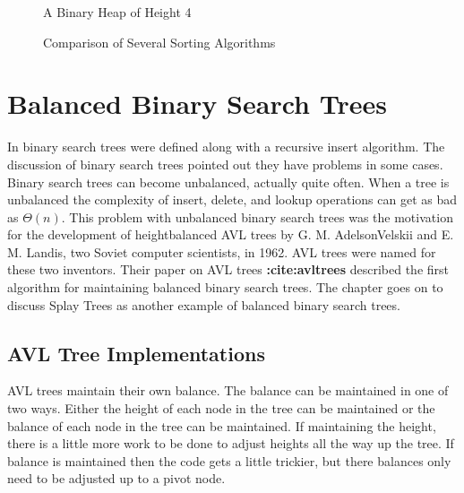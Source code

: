 \documentclass[letterpaper,10pt,english]{sphinxmanual}
\begin{document}
\begin{figure}[htbp]
\centering
\capstart

\noindent{}
\caption{A Binary Heap of Height 4}\label{\detokenize{chap8/chap8:id23}}\end{figure}

\begin{figure}[htbp]
\centering
\capstart

\noindent{}
\caption{Comparison of Several Sorting Algorithms}\label{\detokenize{chap8/chap8:id24}}\end{figure}


\chapter{Balanced Binary Search Trees}
\label{\detokenize{chap9/chap9:balanced-binary-search-trees}}\label{\detokenize{chap9/chap9:balancedtreechap}}\label{\detokenize{chap9/chap9::doc}}
In {\hyperref[\detokenize{chap6/chap6:chap6}]{}} binary search trees were defined along with a recursive insert algorithm. The discussion of binary search trees pointed out they have problems in some cases. Binary search trees can become unbalanced, actually quite often. When a tree is unbalanced the complexity of insert, delete, and lookup operations can get as bad as \(\Theta(n)\). This problem with unbalanced binary search trees was the motivation for the development of height\sphinxhyphen{}balanced AVL trees by G. M. Adelson\sphinxhyphen{}Velskii and E. M. Landis, two Soviet computer scientists, in 1962. AVL trees were named for these two inventors. Their paper on AVL trees {\color{red}\bfseries{}:cite:\textasciigrave{}avltrees\textasciigrave{}} described the first algorithm for maintaining balanced binary search trees. The chapter goes on to discuss Splay Trees as another example of balanced binary search trees.


\section{AVL Tree Implementations}
\label{\detokenize{chap9/chap9:avl-tree-implementations}}
AVL trees maintain their own balance. The balance can be maintained in one of two ways. Either the height of each node in the tree can be maintained or the balance of each node in the tree can be maintained. If maintaining the height, there is a little more work to be done to adjust heights all the way up the tree. If balance is maintained then the code gets a little trickier, but there balances only need to be adjusted up to a pivot node.
\end{document}

